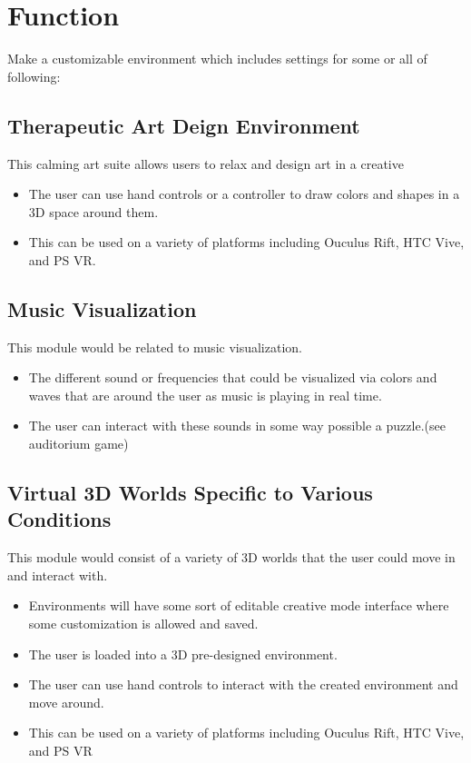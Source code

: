 \documentclass[a4paper,10pt]{article}
\begin{document}
	
	
	\pagebreak
	\section{Function}
	Make a customizable environment which includes settings for some or all of following:
	\subsection{Therapeutic Art Deign Environment}
	This calming art suite allows users to relax and design art in a creative 
	\begin{itemize}
		\item The user can use hand controls or a controller to draw colors and shapes in a 3D space around them. 
		\item This can be used on a variety of platforms including Ouculus Rift, HTC Vive, and PS VR.
	\end{itemize}   
	\subsection{Music Visualization}
	This module would be related to music visualization. 
	\begin{itemize}
		\item The different sound or frequencies that could be visualized via colors and waves that are around the user as music is playing in real time.
		\item The user can interact with these sounds in some way possible a puzzle.(see auditorium game)
	\end{itemize}   
	\subsection{Virtual 3D Worlds Specific to Various Conditions}
	This module would consist of a variety of 3D worlds that the user could move in and interact with. 
	\begin{itemize}
		\item Environments will have some sort of editable creative mode interface where some customization is allowed and saved.
		\item The user is loaded into a 3D pre-designed environment.
		\item The user can use hand controls to interact with the created environment and move around. 
		\item This can be used on a variety of platforms including Ouculus Rift, HTC Vive, and PS VR
	\end{itemize}
\pagebreak
\end{document}
